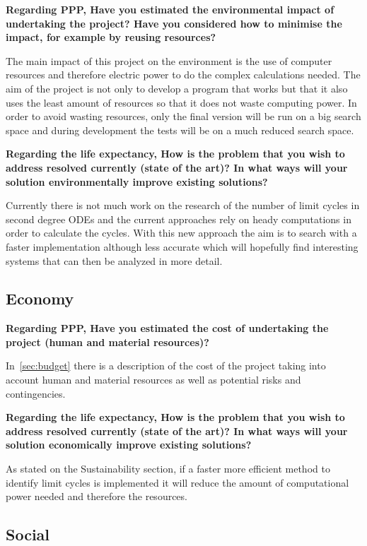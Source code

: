 \noindent\textbf{Regarding PPP, Have you estimated the environmental impact of
undertaking the project? Have you considered how to minimise the impact, for
example by reusing resources?}

The main impact of this project on the environment is the use of computer
resources and therefore electric power to do the complex calculations needed.
The aim of the project is not only to develop a program that works but that it
also uses the least amount of resources so that it does not waste computing
power. In order to avoid wasting resources, only the final version will be run
on a big search space and during development the tests will be on a much reduced
search space.

\noindent\textbf{Regarding the life expectancy, How is the problem that you wish
to address resolved currently (state of the art)? In what ways will your
solution environmentally improve existing solutions?}

Currently there is not much work on the research of the number of limit cycles
in second degree ODEs and the current approaches rely on heady computations in
order to calculate the cycles. With this new approach the aim is to search with
a faster implementation although less accurate which will hopefully find
interesting systems that can then be analyzed in more detail.


\pagebreak
\subsection{Economy}

\noindent\textbf{Regarding PPP, Have you estimated the cost of undertaking the
project (human and material resources)?}

In~\cref{sec:budget} there is a description of the cost of the project taking
into account human and material resources as well as potential risks and
contingencies.

\noindent\textbf{Regarding the life expectancy, How is the problem that you wish
to address resolved currently (state of the art)? In what ways will your
solution economically improve existing solutions?}

As stated on the Sustainability section, if a faster more efficient method to
identify limit cycles is implemented it will reduce the amount of computational
power needed and therefore the resources.


\subsection{Social}

